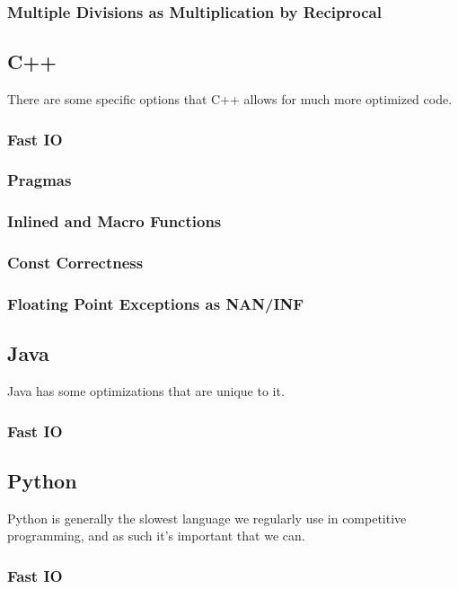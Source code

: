 \subsubsection{Multiple Divisions as Multiplication by Reciprocal}

\subsection{C++}

There are some specific options that C++ allows for much more optimized code.

\subsubsection{Fast IO}

\subsubsection{Pragmas}

\subsubsection{Inlined and Macro Functions}

\subsubsection{Const Correctness}

\subsubsection{Floating Point Exceptions as NAN/INF}

\subsection{Java}

Java has some optimizations that are unique to it.

\subsubsection{Fast IO}

\subsection{Python}

Python is generally the slowest language we regularly use in competitive programming, and as such it's important that we can. 

\subsubsection{Fast IO}
